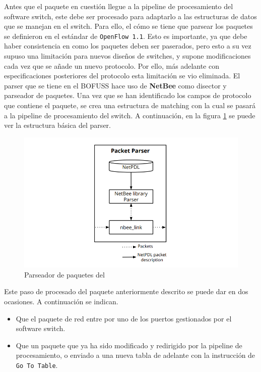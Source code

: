 Antes que el paquete en cuestión llegue a la pipeline de procesamiento del software switch, este debe ser procesado para adaptarlo a las estructuras de datos que se manejan en el switch. Para ello, el cómo se tiene que parsear los paquetes se definieron en el estándar de \texttt{OpenFlow 1.1}. Esto es importante, ya que debe haber consistencia en como los paquetes deben ser paserados, pero esto a su vez supuso una limitación para nuevos diseños de switches, y supone modificaciones cada vez que se añade un nuevo protocolo. Por ello, más adelante con especificaciones posteriores del protocolo esta limitación se vio eliminada. El parser que se tiene en el BOFUSS hace uso de \textbf{NetBee} como disector y parseador de paquetes. Una vez que se han identificado los campos de protocolo que contiene el paquete, se crea una estructura de matching con la cual se pasará a la pipeline de procesamiento del switch. A continuación, en la figura \ref{fig:bofuss3} se puede ver la estructura básica del parser.

\begin{figure}[ht]
    \centering
    \includegraphics[width=\textwidth]{archivos/img/teoria/bofuss3.png}
    \caption{Parseador de paquetes del  \cite{fernandes2015software}}
    \label{fig:bofuss3}
\end{figure}

Este paso de procesado del paquete anteriormente descrito se puede dar en dos ocasiones. A continuación se indican.

\begin{itemize}
    \item Que el paquete de red entre por uno de los puertos gestionados por el software switch.
    \item Que un paquete que ya ha sido modificado y redirigido por la pipeline de procesamiento, o enviado a una nueva tabla de adelante con la instrucción de \texttt{Go To Table}.
\end{itemize}

